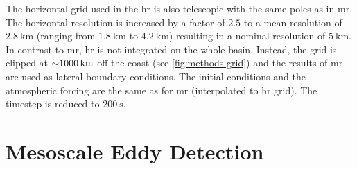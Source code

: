 The horizontal grid used in the \ac{hr} is also telescopic with the same poles as in \ac{mr}. The horizontal resolution is increased by a factor of $2.5$ to a mean resolution of $\SI{2.8}{\kilo\metre}$ (ranging from $\SI{1.8}{\kilo\metre}$ to $\SI{4.2}{\kilo\metre}$) resulting in a nominal resolution of $\SI{5}{\kilo\metre}$.\\
In contrast to \ac{mr}, \ac{hr} is not integrated on the whole basin. Instead, the grid is clipped at ${\sim}\SI{1000}{\kilo\metre}$ off the coast (see \autoref{fig:methods-grid}) and the results of \ac{mr} are used as lateral boundary conditions. The initial conditions and the atmospheric forcing are the same as for \ac{mr} (interpolated to \ac{hr} grid). The timestep is reduced to $\SI{200}{\second}$.

\section{Mesoscale Eddy Detection}\label{sec:data-methods-eddydetection}

